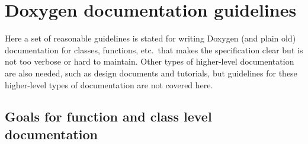%
\section{Doxygen documentation guidelines}
%

Here a set of reasonable guidelines is stated for writing Doxygen (and plain
old) documentation for classes, functions, etc.\ that makes the specification
clear but is not too verbose or hard to maintain.  Other types of higher-level
documentation are also needed, such as design documents and tutorials, but
guidelines for these higher-level types of documentation are not covered here.

%
\subsection{Goals for function and class level documentation}
%

